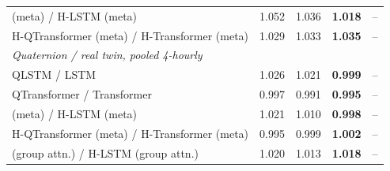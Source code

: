 \begin{tabular}{lrrrr}
\HQ{} (meta) / H-LSTM (meta) & 1.052 & 1.036 & \textbf{1.018} & -- \\
H-QTransformer (meta) / H-Transformer (meta) & 1.029 & 1.033 & \textbf{1.035} & -- \\
\midrule
\multicolumn{5}{l}{\emph{Quaternion / real twin, pooled 4-hourly}} \\
QLSTM / LSTM & 1.026 & 1.021 & \textbf{0.999} & -- \\
QTransformer / Transformer & 0.997 & 0.991 & \textbf{0.995} & -- \\
\HQ{} (meta) / H-LSTM (meta) & 1.021 & 1.010 & \textbf{0.998} & -- \\
H-QTransformer (meta) / H-Transformer (meta) & 0.995 & 0.999 & \textbf{1.002} & -- \\
\HQ{} (group attn.) / H-LSTM (group attn.) & 1.020 & 1.013 & \textbf{1.018} & -- \\
\bottomrule
\end{tabular}
